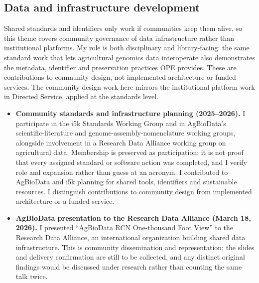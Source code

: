 \subsection{Data and infrastructure development}
Shared standards and identifiers only work if communities keep them alive, so this theme covers community governance of data infrastructure rather than institutional platforms. My role is both disciplinary and library-facing: the same standard work that lets agricultural genomics data interoperate also demonstrates the metadata, identifier and preservation practices OPE provides. These are contributions to community design, not implemented architecture or funded services. The community design work here mirrors the institutional platform work in Directed Service, applied at the standards level.

\begin{itemize}
\item \textbf{Community standards and infrastructure planning (2025--2026).} I participate in the i5k Standards Working Group and in AgBioData's scientific-literature and genome-assembly-nomenclature working groups, alongside involvement in a Research Data Alliance working group on agricultural data. Membership is preserved as participation; it is not proof that every assigned standard or software action was completed, and I verify role and expansion rather than guess at an acronym. I contributed to AgBioData and i5k planning for shared tools, identifiers and sustainable resources. I distinguish contributions to community design from implemented architecture or a funded service.
\item \textbf{AgBioData presentation to the Research Data Alliance (March 18, 2026).} I presented ``AgBioData RCN One-thousand Foot View'' to the Research Data Alliance, an international organization building shared data infrastructure. This is community dissemination and representation; the slides and delivery confirmation are still to be collected, and any distinct original findings would be discussed under research rather than counting the same talk twice.
\end{itemize}
\par\endgroup
